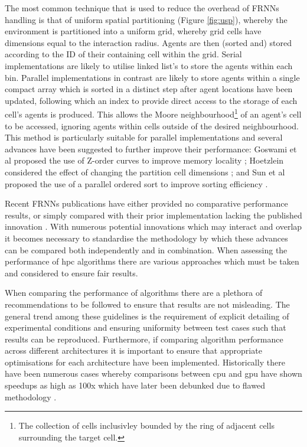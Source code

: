   The most common technique that is used to reduce the overhead of FRNNs handling is that of uniform spatial partitioning (Figure \ref{fig:usp}), whereby the environment is partitioned into a uniform grid, whereby grid cells have dimensions equal to the interaction radius. Agents are then (sorted and) stored according to the ID of their containing cell within the grid. Serial implementations are likely to utilise linked list's to store the agents within each bin. Parallel implementations in contrast are likely to store agents within a single compact array which is sorted in a distinct step after agent locations have been updated, following which an index to provide direct access to the storage of each cell’s agents is produced. This allows the Moore neighbourhood\footnote{The collection of cells inclusivley bounded by the ring of adjacent cells surrounding the target cell.} of an agent’s cell to be accessed, ignoring agents within cells outside of the desired neighbourhood. This method is particularly suitable for parallel implementations \cite{Gre10} and several advances have been suggested to further improve their performance: Goswami et al proposed the use of Z-order curves to improve memory locality \cite{GS*10}; Hoetzlein considered the effect of changing the partition cell dimensions \cite{Hoe14}; and Sun et al proposed the use of a parallel ordered sort to improve sorting efficiency \cite{HY*15}.

  Recent FRNNs publications have either provided no comparative performance results, or simply compared with their prior implementation lacking the published innovation \cite{GS*10,Hoe14,HY*15}. With numerous potential innovations which may interact and overlap it becomes necessary to standardise the methodology by which these advances can be compared both independently and in combination. When assessing the performance of \gls{hpc} algorithms there are various approaches which must be taken and considered to ensure fair results.
  
  When comparing the performance of algorithms there are a plethora of recommendations to be followed to ensure that results are not misleading\cite{Bai92}. The general trend among these guidelines is the requirement of explicit detailing of experimental conditions and ensuring uniformity between test cases such that results can be reproduced. Furthermore, if comparing algorithm performance across different architectures it is important to ensure that appropriate optimisations for each architecture have been implemented. Historically there have been numerous cases whereby comparisons between \gls{cpu} and \gls{gpu} have shown speedups as high as 100x which have later been debunked due to flawed methodology \cite{LK*10}.

